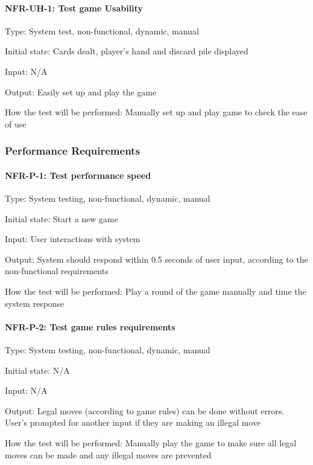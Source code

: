 \documentclass[12pt, titlepage]{article}
\begin{document}
\paragraph{NFR-UH-1: Test game Usability\\}

Type: System test, non-functional, dynamic, manual

Initial state: Cards dealt, player's hand and discard pile displayed

Input: N/A

Output: Easily set up and play the game

How the test will be performed: Manually set up and play game to check the ease of use

\subsubsection{Performance Requirements}

\paragraph{NFR-P-1: Test performance speed\\}

Type: System testing, non-functional, dynamic, manual

Initial state: Start a new game 

Input: User interactions with system

Output: System should respond within 0.5 seconds of user input, according to the non-functional requirements

How the test will be performed: Play a round of the game manually and time the system response

\paragraph{NFR-P-2: Test game rules requirements\\}

Type: System testing, non-functional, dynamic, manual

Initial state: N/A

Input: N/A

Output: Legal moves (according to game rules) can be done without errors. User's prompted for another input if they are making an illegal move

How the test will be performed: Manually play the game to make sure all legal moves can be made and any illegal moves are prevented
\end{document}

